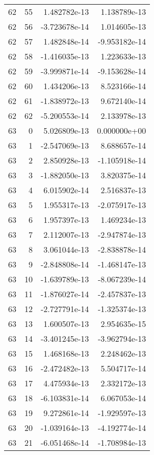 \begin{tabular}{rrrr}
  62 &   55 &  1.482782e-13 &  1.138789e-13 \\
  62 &   56 & -3.723678e-14 &  1.014605e-13 \\
  62 &   57 &  1.482848e-14 & -9.953182e-14 \\
  62 &   58 & -1.416035e-13 &  1.223633e-13 \\
  62 &   59 & -3.999871e-14 & -9.153628e-14 \\
  62 &   60 &  1.434206e-13 &  8.523166e-14 \\
  62 &   61 & -1.838972e-13 &  9.672140e-14 \\
  62 &   62 & -5.200553e-14 &  2.133978e-13 \\
  63 &    0 &  5.026809e-13 &  0.000000e+00 \\
  63 &    1 & -2.547069e-13 &  8.688657e-14 \\
  63 &    2 &  2.850928e-13 & -1.105918e-14 \\
  63 &    3 & -1.882050e-13 &  3.820375e-14 \\
  63 &    4 &  6.015902e-14 &  2.516837e-13 \\
  63 &    5 &  1.955317e-13 & -2.075917e-13 \\
  63 &    6 &  1.957397e-13 &  1.469234e-13 \\
  63 &    7 &  2.112007e-13 & -2.947874e-13 \\
  63 &    8 &  3.061044e-13 & -2.838878e-14 \\
  63 &    9 & -2.848808e-14 & -1.468147e-13 \\
  63 &   10 & -1.639789e-13 & -8.067239e-14 \\
  63 &   11 & -1.876027e-14 & -2.457837e-13 \\
  63 &   12 & -2.727791e-14 & -1.325374e-13 \\
  63 &   13 &  1.600507e-13 &  2.954635e-15 \\
  63 &   14 & -3.401245e-13 & -3.962794e-13 \\
  63 &   15 &  1.468168e-13 &  2.248462e-13 \\
  63 &   16 & -2.472482e-13 &  5.504717e-14 \\
  63 &   17 &  4.475934e-13 &  2.332172e-13 \\
  63 &   18 & -6.103831e-14 &  6.067053e-14 \\
  63 &   19 &  9.272861e-14 & -1.929597e-13 \\
  63 &   20 & -1.039164e-13 & -4.192774e-14 \\
  63 &   21 & -6.051468e-14 & -1.708984e-13 \\

\end{tabular}
